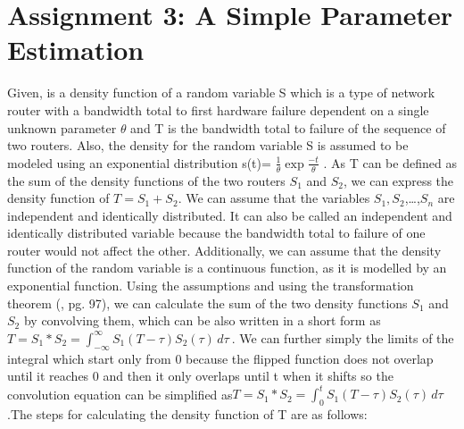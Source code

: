 \chapter{Assignment 3: A Simple Parameter Estimation}

Given, is a density function of a random variable S which is a type of network router with a bandwidth total to first hardware failure dependent on a single unknown parameter $\theta$ and T is the bandwidth total to failure of the sequence of two routers. Also, the density for the random variable S is assumed to be modeled using an exponential distribution s(t)=  $\frac{1}{\theta} \exp{\frac{-t}{\theta}}$ . As T can be defined as the sum of the density functions of the two routers $S_1$  and $S_2$, we can express the density function of  $T= S_1+S_2$.\newline \newline 
We can assume that the variables $S_1,S_2$,…,$S_n$ are independent and identically distributed. It can also be called an independent and identically distributed variable because the bandwidth total to failure of one router would not affect the other. Additionally, we can assume that the density function of the random variable is a continuous function, as it is modelled by an exponential function.\newline \newline
Using the assumptions and using the transformation theorem (\cite{Iubh:2021}, pg. 97), we can calculate the sum of the two density functions $S_1$  and $S_2$ by convolving them, which can be also written in a short form as $T=S_1*S_2= \int_{-\infty}^{\infty} S_1(T-\tau) S_2(\tau) \,d\tau\ $.\newline\newline
We can further simply the limits of the integral which start only from 0 because the flipped function does not overlap until it reaches 0 and then it only overlaps until t when it shifts so the convolution equation can be simplified as$T=S_1*S_2= \int_{0}^{t} S_1(T-\tau) S_2(\tau)\,d\tau\ $.The steps for calculating the density function of T are as follows:

